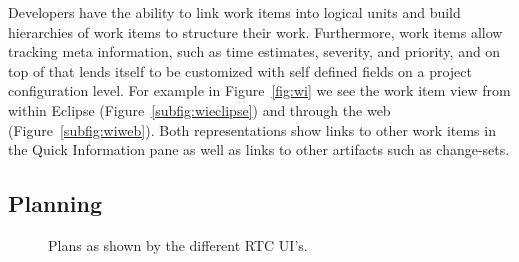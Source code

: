 Developers have the ability to link work items into logical units and build hierarchies of work items to structure their work.
Furthermore, work items allow tracking meta information, such as time estimates, severity, and priority, and on top of that lends itself to be customized with self defined fields on a project configuration level.
For example in Figure~\ref{fig:wi} we see the work item view from within Eclipse (Figure~\ref{subfig:wieclipse}) and through the web (Figure~\ref{subfig:wiweb}).
Both representations show links to other work items in the Quick Information pane as well as links to other artifacts such as change-sets.

\subsection{Planning}
\begin{figure}[t]
\centering
{}
\caption{Plans as shown by the different RTC UI's.}
\label{fig:plan}
\end{figure}
